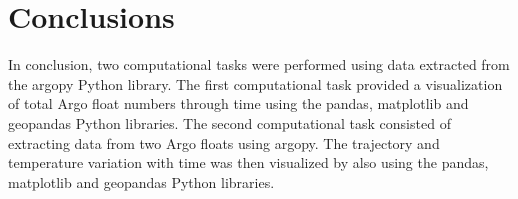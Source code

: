 \documentclass{article}
\begin{document}
 

\section{Conclusions}

In conclusion, two computational tasks were performed using data extracted from the argopy Python library. The first computational task provided a visualization of total Argo float numbers through time using the pandas, matplotlib and geopandas Python libraries. The second computational task consisted of extracting data from two Argo floats using argopy. The trajectory and temperature variation with time was then visualized by also using the pandas, matplotlib and geopandas Python libraries.


\end{document}
